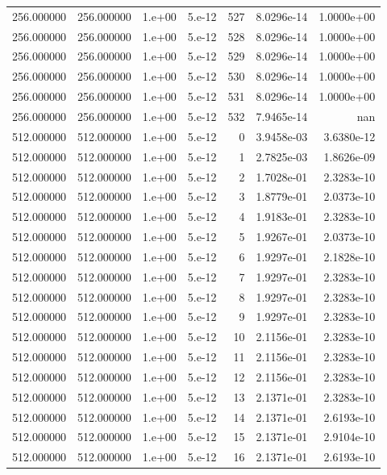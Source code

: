 \begin{table}[htbp]
\begin{tabular}{rrrrrrr}
256.000000 & 256.000000 & 1.e+00 & 5.e-12 & 527 & 8.0296e-14 & 1.0000e+00 \\
256.000000 & 256.000000 & 1.e+00 & 5.e-12 & 528 & 8.0296e-14 & 1.0000e+00 \\
256.000000 & 256.000000 & 1.e+00 & 5.e-12 & 529 & 8.0296e-14 & 1.0000e+00 \\
256.000000 & 256.000000 & 1.e+00 & 5.e-12 & 530 & 8.0296e-14 & 1.0000e+00 \\
256.000000 & 256.000000 & 1.e+00 & 5.e-12 & 531 & 8.0296e-14 & 1.0000e+00 \\
256.000000 & 256.000000 & 1.e+00 & 5.e-12 & 532 & 7.9465e-14 & nan \\
512.000000 & 512.000000 & 1.e+00 & 5.e-12 & 0 & 3.9458e-03 & 3.6380e-12 \\
512.000000 & 512.000000 & 1.e+00 & 5.e-12 & 1 & 2.7825e-03 & 1.8626e-09 \\
512.000000 & 512.000000 & 1.e+00 & 5.e-12 & 2 & 1.7028e-01 & 2.3283e-10 \\
512.000000 & 512.000000 & 1.e+00 & 5.e-12 & 3 & 1.8779e-01 & 2.0373e-10 \\
512.000000 & 512.000000 & 1.e+00 & 5.e-12 & 4 & 1.9183e-01 & 2.3283e-10 \\
512.000000 & 512.000000 & 1.e+00 & 5.e-12 & 5 & 1.9267e-01 & 2.0373e-10 \\
512.000000 & 512.000000 & 1.e+00 & 5.e-12 & 6 & 1.9297e-01 & 2.1828e-10 \\
512.000000 & 512.000000 & 1.e+00 & 5.e-12 & 7 & 1.9297e-01 & 2.3283e-10 \\
512.000000 & 512.000000 & 1.e+00 & 5.e-12 & 8 & 1.9297e-01 & 2.3283e-10 \\
512.000000 & 512.000000 & 1.e+00 & 5.e-12 & 9 & 1.9297e-01 & 2.3283e-10 \\
512.000000 & 512.000000 & 1.e+00 & 5.e-12 & 10 & 2.1156e-01 & 2.3283e-10 \\
512.000000 & 512.000000 & 1.e+00 & 5.e-12 & 11 & 2.1156e-01 & 2.3283e-10 \\
512.000000 & 512.000000 & 1.e+00 & 5.e-12 & 12 & 2.1156e-01 & 2.3283e-10 \\
512.000000 & 512.000000 & 1.e+00 & 5.e-12 & 13 & 2.1371e-01 & 2.3283e-10 \\
512.000000 & 512.000000 & 1.e+00 & 5.e-12 & 14 & 2.1371e-01 & 2.6193e-10 \\
512.000000 & 512.000000 & 1.e+00 & 5.e-12 & 15 & 2.1371e-01 & 2.9104e-10 \\
512.000000 & 512.000000 & 1.e+00 & 5.e-12 & 16 & 2.1371e-01 & 2.6193e-10 \\

\end{tabular}
\end{table}
